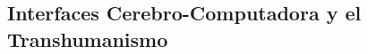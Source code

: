 \begin{refsection}
\chapter{Interfaces Cerebro-Computadora y el Transhumanismo}
\label{chapter:chapter-15}


\begin{comment}
Interfaces Cerebro-Computadora y el Transhumanismo (Capítulo 15)
\begin{itemize}
    \item Análisis de tecnologías que conectan el cerebro con sistemas computacionales.
    \item Implicaciones éticas del transhumanismo y desigualdades de acceso.
    \item Actividad: Simular tareas cognitivas asistidas con interfaces cerebro-computadora en Python.
\end{itemize}
\end{comment}



\nocite{*}

\printbibliography[heading=subbibliography, title={Bibliografía del Capítulo 15}]
\end{refsection}
